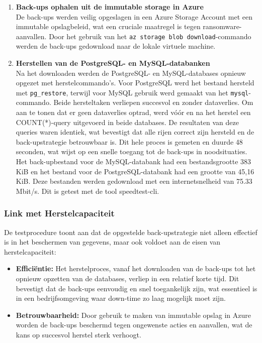 \begin{enumerate}
    \item \textbf{Back-ups ophalen uit de immutable storage in Azure} \\
    De back-ups werden veilig opgeslagen in een Azure Storage Account met een immutable opslagbeleid, wat een cruciale maatregel is tegen ransomware-aanvallen. Door het gebruik van het \texttt{az storage blob download}-commando werden de back-ups gedownload naar de lokale virtuele machine.
    
    \item \textbf{Herstellen van de PostgreSQL- en MySQL-databanken} \\
    Na het downloaden werden de PostgreSQL- en MySQL-databases opnieuw opgezet met herstelcommando’s. Voor PostgreSQL werd het bestand hersteld met \texttt{pg\_restore}, terwijl voor MySQL gebruik werd gemaakt van het \texttt{mysql}-commando. Beide hersteltaken verliepen succesvol en zonder dataverlies. Om aan te tonen dat er geen dataverlies optrad, werd vóór en na het herstel een COUNT(*)-query uitgevoerd in beide databases. De resultaten van deze queries waren identiek, wat bevestigt dat alle rijen correct zijn hersteld en de back-upstrategie betrouwbaar is. Dit hele proces is gemeten en duurde 48 seconden, wat wijst op een snelle toegang tot de back-ups in noodsituaties. Het back-upbestand voor de MySQL-databank had een bestandsgrootte 383 KiB en het bestand voor de PostgreSQL-databank had een grootte van 45,16 KiB. Deze bestanden werden gedownload met een internetsnelheid van 75.33 Mbit/s. Dit is getest met de tool speedtest-cli.
\end{enumerate}

\subsubsection{Link met Herstelcapaciteit}
De testprocedure toont aan dat de opgestelde back-upstrategie niet alleen effectief is in het beschermen van gegevens, maar ook voldoet aan de eisen van herstelcapaciteit:

\begin{itemize}
    \item \textbf{Efficiëntie:} Het herstelproces, vanaf het downloaden van de back-ups tot het opnieuw opzetten van de databases, verliep in een relatief korte tijd. Dit bevestigt dat de back-ups eenvoudig en snel toegankelijk zijn, wat essentieel is in een bedrijfsomgeving waar down-time zo laag mogelijk moet zijn.
    
    \item \textbf{Betrouwbaarheid:} Door gebruik te maken van immutable opslag in Azure worden de back-ups beschermd tegen ongewenste acties en aanvallen, wat de kans op succesvol herstel sterk verhoogt.
\end{itemize}

